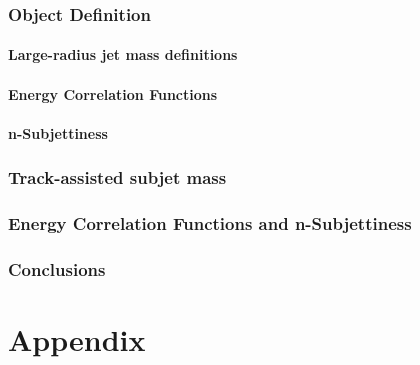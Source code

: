 \documentclass[UKenglish,texlive=2013]{\ATLASLATEXPATH atlasdoc}
\begin{document}
\section{Object Definition}
\label{sec:objdef}

\subsection{Large-radius jet mass definitions}

\subsection{Energy Correlation Functions}

\subsection{n-Subjettiness}

\section{Track-assisted subjet mass}
\label{sec:mtas}


\section{Energy Correlation Functions and n-Subjettiness}
\label{sec:ECFnS}



\section{Conclusions}
\label{sec:conclusions}

\clearpage
\appendix
\part*{Appendix}
\end{document}
